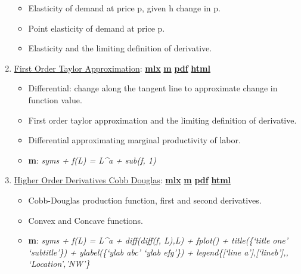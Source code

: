 \documentclass[
]{book}
\providecommand{\tightlist}{%
  \setlength{\itemsep}{0pt}\setlength{\parskip}{0pt}}
\begin{document}
\begin{enumerate}
  \begin{itemize}
  \tightlist
  \item
    Elasticity of demand at price p, given h change in p.
  \item
    Point elasticity of demand at price p.
  \item
    Elasticity and the limiting definition of derivative.
  \end{itemize}
\item
  \href{https://fanwangecon.github.io/Math4Econ/derivative/htmlpdfm/derivative_MPL_first_order_taylor_approximation.html}{First Order Taylor Approximation}: \href{https://github.com/FanWangEcon/Math4Econ/blob/master/derivative/derivative_MPL_first_order_taylor_approximation.mlx}{\textbf{mlx}} \textbar{} \href{https://github.com/FanWangEcon/Math4Econ/blob/master/derivative/htmlpdfm/derivative_MPL_first_order_taylor_approximation.m}{\textbf{m}} \textbar{} \href{https://github.com/FanWangEcon/Math4Econ/blob/master/derivative/htmlpdfm/derivative_MPL_first_order_taylor_approximation.pdf}{\textbf{pdf}} \textbar{} \href{https://fanwangecon.github.io/Math4Econ/derivative/htmlpdfm/derivative_MPL_first_order_taylor_approximation.html}{\textbf{html}}

  \begin{itemize}
  \tightlist
  \item
    Differential: change along the tangent line to approximate change in function value.
  \item
    First order taylor approximation and the limiting definition of derivative.
  \item
    Differential approximating marginal productivity of labor.
  \item
    \textbf{m}: \emph{syms + f(L) = L\^{}a + sub(f, 1)}
  \end{itemize}
\item
  \href{https://fanwangecon.github.io/Math4Econ/derivative/htmlpdfm/second_derivative.html}{Higher Order Derivatives Cobb Douglas}: \href{https://github.com/FanWangEcon/Math4Econ/blob/master/derivative/second_derivative.mlx}{\textbf{mlx}} \textbar{} \href{https://github.com/FanWangEcon/Math4Econ/blob/master/derivative/htmlpdfm/second_derivative.m}{\textbf{m}} \textbar{} \href{https://github.com/FanWangEcon/Math4Econ/blob/master/derivative/htmlpdfm/second_derivative.pdf}{\textbf{pdf}} \textbar{} \href{https://fanwangecon.github.io/Math4Econ/derivative/htmlpdfm/second_derivative.html}{\textbf{html}}

  \begin{itemize}
  \tightlist
  \item
    Cobb-Douglas production function, first and second derivatives.
  \item
    Convex and Concave functions.
  \item
    \textbf{m}: \emph{syms + f(L) = L\^{}a + diff(diff(f, L),L) + fplot() + title(\{`title one' `subtitle'\}) + ylabel(\{`ylab abc' `ylab efg'\}) + legend\{{[}`line a'{]},{[}`lineb'{]},, `Location','NW'\}}
  \end{itemize}
\end{enumerate}
\end{document}
